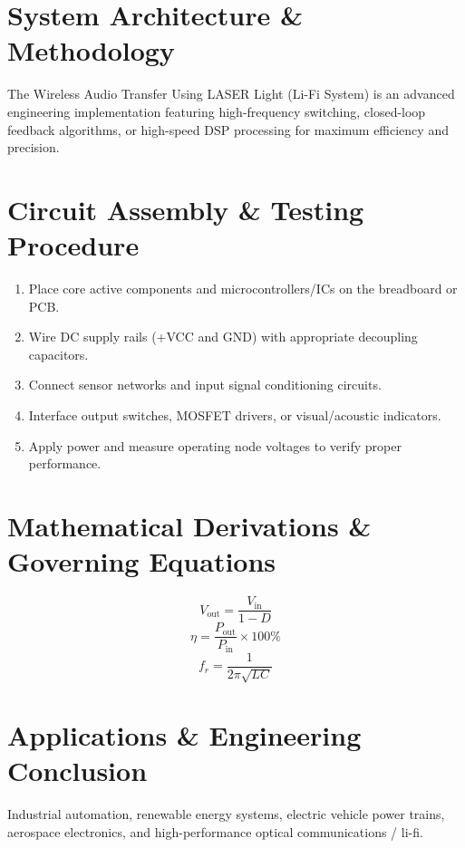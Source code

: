\documentclass[11pt,a4paper]{article}
\begin{document}
\section{System Architecture \& Methodology}
The Wireless Audio Transfer Using LASER Light (Li-Fi System) is an advanced engineering implementation featuring high-frequency switching, closed-loop feedback algorithms, or high-speed DSP processing for maximum efficiency and precision.

\section{Circuit Assembly \& Testing Procedure}
\begin{enumerate}
    \item Place core active components and microcontrollers/ICs on the breadboard or PCB.
    \item Wire DC supply rails (+VCC and GND) with appropriate decoupling capacitors.
    \item Connect sensor networks and input signal conditioning circuits.
    \item Interface output switches, MOSFET drivers, or visual/acoustic indicators.
    \item Apply power and measure operating node voltages to verify proper performance.
\end{enumerate}

\section{Mathematical Derivations \& Governing Equations}
\begin{equation}
V_{\text{out}} = \frac{V_{\text{in}}}{1 - D}
\end{equation}
\begin{equation}
\eta = \frac{P_{\text{out}}}{P_{\text{in}}} \times 100\%
\end{equation}
\begin{equation}
f_r = \frac{1}{2\pi \sqrt{L C}}
\end{equation}

\section{Applications \& Engineering Conclusion}
Industrial automation, renewable energy systems, electric vehicle power trains, aerospace electronics, and high-performance optical communications / li-fi.
\end{document}

